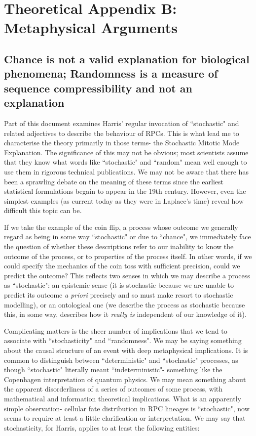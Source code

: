 \chapter{Theoretical Appendix B: Metaphysical Arguments}
\section{Chance is not a valid explanation for biological phenomena; Randomness is a measure of sequence compressibility and not an explanation}
\label{sec:chance}
Part of this document examines Harris' regular invocation of ``stochastic" and related adjectives to describe the behaviour of RPCs. This is what lead me to characterise the theory primarily in those terms- the Stochastic Mitotic Mode Explanation. The significance of this may not be obvious; most scientists assume that they know what words like ``stochastic" and ``random" mean well enough to use them in rigorous technical publications. We may not be aware that there has been a sprawling debate on the meaning of these terms since the earliest statistical formulations begain to appear in the 19th century. However, even the simplest examples (as current today as they were in Laplace's time) reveal how difficult this topic can be.

If we take the example of the coin flip, a process whose outcome we generally regard as being in some way ``stochastic" or due to ``chance", we immediately face the question of whether these descriptions refer to our inability to know the outcome of the process, or to properties of the process itself. In other words, if we could specify the mechanics of the coin toss with sufficient precision, could we predict the outcome? This reflects two senses in which we may describe a process as ``stochastic": an epistemic sense (it is stochastic because we are unable to predict its outcome \textit{a priori} precisely and so must make resort to stochastic modelling), or an ontological one (we describe the process as stochastic because this, in some way, describes how it \textit{really is} independent of our knowledge of it).

Complicating matters is the sheer number of implications that we tend to associate with ``stochasticity" and ``randomness". We may be saying something about the causal structure of an event with deep metaphysical implications. It is common to distinguish between ``deterministic" and ``stochastic" processes, as though ``stochastic" literally meant ``indeterministic"- something like the Copenhagen interpretation of quantum physics. We may mean something about the apparent disorderliness of a series of outcomes of some process, with mathematical and information theoretical implications. What is an apparently simple observation- cellular fate distribution in RPC lineages is ``stochastic", now seems to require at least a little clarification or interpretation. We may say that stochasticity, for Harris, applies to at least the following entities:

